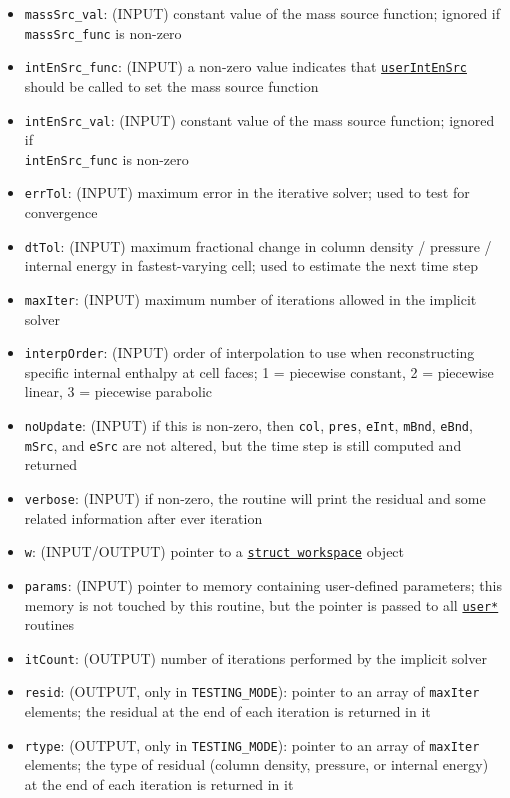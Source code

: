 \documentclass[12pt]{article}
\begin{document}
\begin{itemize}
\item \verb=massSrc_val=: (INPUT) constant value of the mass source function; ignored if\\
\verb=massSrc_func= is non-zero
\item \verb=intEnSrc_func=: (INPUT) a non-zero value indicates that \hyperref[sssec:userIntEnSrc]{\texttt{userIntEnSrc}} should be called to set the mass source function
\item \verb=intEnSrc_val=: (INPUT) constant value of the mass source function; ignored if \\\verb=intEnSrc_func= is non-zero
\item \texttt{errTol}: (INPUT) maximum error in the iterative solver; used to test for convergence
\item \texttt{dtTol}: (INPUT) maximum fractional change in column density / pressure / internal energy in fastest-varying cell; used to estimate the next time step
\item \texttt{maxIter}: (INPUT) maximum number of iterations allowed in the implicit solver
\item \texttt{interpOrder}: (INPUT) order of interpolation to use when reconstructing specific internal enthalpy at cell faces; 1 = piecewise constant, 2 = piecewise linear, 3 = piecewise parabolic
\item \texttt{noUpdate}: (INPUT) if this is non-zero, then \texttt{col}, \texttt{pres}, \texttt{eInt}, \texttt{mBnd}, \texttt{eBnd}, \texttt{mSrc}, and \texttt{eSrc} are not altered, but the time step is still computed and returned
\item \texttt{verbose}: (INPUT) if non-zero, the routine will print the residual and some related information after ever iteration
\item \texttt{w}: (INPUT/OUTPUT) pointer to a \hyperref[sssec:datastructures]{\texttt{struct workspace}} object
\item \texttt{params}: (INPUT) pointer to memory containing user-defined parameters; this memory is not touched by this routine, but the pointer is passed to all \hyperref[sssec:userAlpha]{\texttt{user*}} routines
\item \texttt{itCount}: (OUTPUT) number of iterations performed by the implicit solver
\item \texttt{resid}: (OUTPUT, only in \verb=TESTING_MODE=): pointer to an array of \texttt{maxIter} elements; the residual at the end of each iteration is returned in it
\item \texttt{rtype}: (OUTPUT, only in \verb=TESTING_MODE=): pointer to an array of \texttt{maxIter} elements; the type of residual (column density, pressure, or internal energy) at the end of each iteration is returned in it

\end{itemize}
\end{document}
